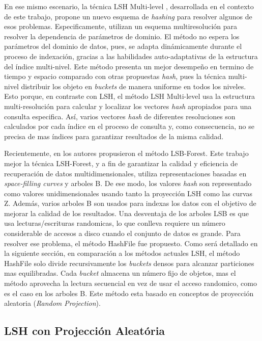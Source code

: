 En ese mismo escenario,  la técnica LSH Multi-level \cite{DBLP:journals/jidm/OcsaS10}, desarrollada en el contexto de este trabajo, propone un nuevo esquema de \textit{hashing} para resolver algunos de esos problemas. Especificamente, utilizan un esquema multiresolución para resolver la dependencia de parámetros de dominio. El método no espera los parámetros del dominio de datos, pues, se adapta dinámicamente durante el proceso de indexación, gracias a las habilidades auto-adaptativas de la estructura del índice multi-nivel. Este método presenta un mejor desempeño en termino de tiempo y espacio comparado con otras propuestas \textit{hash}, pues la técnica multi-nivel distribuir los objeto en \textit{buckets} de manera uniforme en todos los niveles. Esto porque, en contraste con LSH, el método LSH Multi-level usa la estructura multi-resolución para calcular y localizar los vectores \textit{hash} apropiados para una consulta especifica. Así, varios vectores \textit{hash} de diferentes resoluciones son calculados por cada índice en el proceso de consulta y, como consecuencia, no se precisa de mas índices para garantizar resultados de la misma calidad.

Recientemente, en \cite{taoLSBLSH}  los autores propusieron el método LSB-Forest. Este trabajo mejor la técnica LSH-Forest, y a fin de garantizar la calidad y eficiencia de recuperación de datos multidimensionales, utiliza representaciones basadas en \textit{space-filling curves} y arboles B. De ese modo, los valores \textit{hash} son representado como valores unidimensionales usando tanto la proyección LSH como las curvas Z. Además, varios arboles B son usados para indexas los datos con el objetivo de mejorar la calidad de los resultados. Una desventaja de los arboles LSB es que usa lecturas/escrituras randomicas, lo que conlleva requiere un número considerable de accesos a disco cuando el conjunto de datos es grande. Para resolver ese problema, el método HashFile \cite{lshHashFile}  fue propuesto. Como será detallado en la siguiente sección, en comparación a los métodos actuales LSH, el método HashFile solo divide recursivamente los \textit{buckets} densos para alcanzar particiones mas equilibradas. Cada \textit{bucket} almacena un número fijo de objetos, mas el método aprovecha la lectura secuencial en vez de usar el acceso randomico, como es el caso en los arboles  B. Este método esta basado en conceptos de proyección aleatoria (\textit{Random Projection}).
 
 

\subsection{LSH con Projección Aleatória}\label{sec:hashfile}

